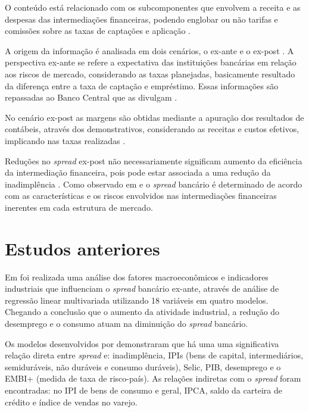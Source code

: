\documentclass[12pt,openright,oneside,a4paper,chapter=TITLE,section=TITLE,subsection=Title,english,french,spanish,portugues,sumario=tradicional]{04-class-files/abntex2}
\begin{document}
O conteúdo está relacionado com os subcomponentes que envolvem a receita e as despesas das intermediações financeiras, podendo englobar ou não tarifas e comissões sobre as taxas de captações e aplicação \cite{block:2000}.

A origem da informação é analisada em dois cenários, o ex-ante e o ex-post \cite{kunt:1999}. A perspectiva ex-ante se refere a expectativa das instituições bancárias em relação aos riscos de mercado, considerando as taxas planejadas, basicamente resultado da diferença entre a taxa de captação e empréstimo. Essas informações são repassadas ao Banco Central que as divulgam \cite{durigan:2018}.

No cenário ex-post as margens são obtidas mediante a apuração dos resultados de contábeis, através dos demonstrativos, considerando as receitas e custos efetivos, implicando nas taxas realizadas \cite{kunt:1999, durigan:2018}.

Reduções no \emph{spread} ex-post não necessariamente significam aumento da eficiência da intermediação financeira, pois pode estar associada a uma redução da inadimplência \cite{kunt:1999}. Como observado em \textcite{klein:1971} e \textcite{ho-saunders:1981} o \emph{spread} bancário é determinado de acordo com as características e os riscos envolvidos nas intermediações financeiras inerentes em cada estrutura de mercado.

\section{Estudos anteriores}

Em \textcite{durigan:2018} foi realizada uma análise dos fatores macroeconômicos e indicadores industriais que influenciam o \emph{spread} bancário ex-ante, através de análise de regressão linear multivariada utilizando 18 variáveis em quatro modelos. Chegando a conclusão que o aumento da atividade industrial, a redução do desemprego e o consumo atuam na diminuição do \emph{spread} bancário.

Os modelos desenvolvidos por \textcite{durigan:2018} demonstraram que há uma uma significativa relação direta entre \emph{spread} e: inadimplência, IPIs (bens de capital, intermediários, semiduráveis, não duráveis e consumo duráveis), Selic, PIB, desemprego e o EMBI+ (medida de taxa de risco-país). As relações indiretas com o \emph{spread} foram encontradas: no IPI de bens de consumo e geral, IPCA, saldo da carteira de crédito e índice de vendas no varejo.
\end{document}
